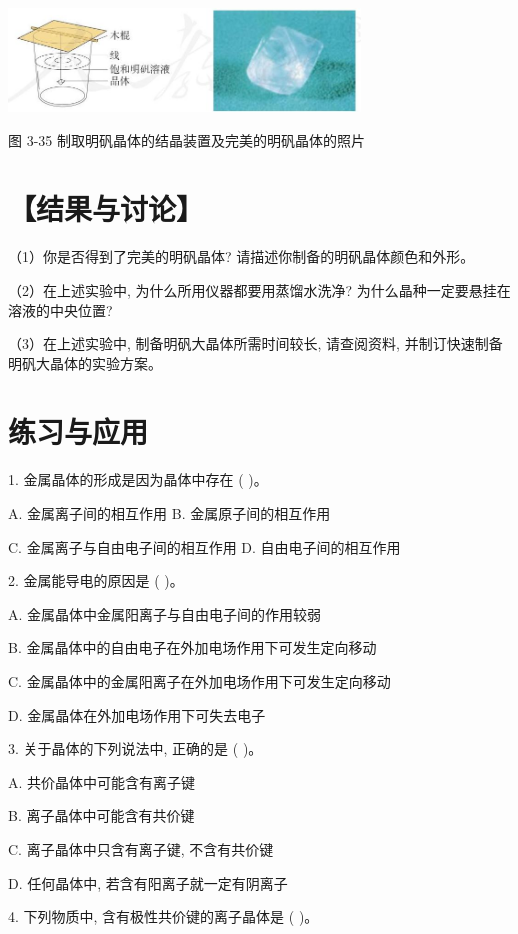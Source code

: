 \documentclass[10pt]{article}
\begin{document}
\begin{center}
\includegraphics[max width=0.7\textwidth]{images/0190e026-5a11-7df7-bd27-54d09026ba7a_96_199934.jpg}
\end{center}

图 3-35 制取明矾晶体的结晶装置及完美的明矾晶体的照片

\section*{【结果与讨论】}

（1）你是否得到了完美的明矾晶体? 请描述你制备的明矾晶体颜色和外形。

（2）在上述实验中, 为什么所用仪器都要用蒸馏水洗净? 为什么晶种一定要悬挂在溶液的中央位置?

（3）在上述实验中, 制备明矾大晶体所需时间较长, 请查阅资料, 并制订快速制备明矾大晶体的实验方案。

\section*{练习与应用}

1. 金属晶体的形成是因为晶体中存在 ( )。

A. 金属离子间的相互作用 B. 金属原子间的相互作用

C. 金属离子与自由电子间的相互作用 D. 自由电子间的相互作用

2. 金属能导电的原因是 ( )。

A. 金属晶体中金属阳离子与自由电子间的作用较弱

B. 金属晶体中的自由电子在外加电场作用下可发生定向移动

C. 金属晶体中的金属阳离子在外加电场作用下可发生定向移动

D. 金属晶体在外加电场作用下可失去电子

3. 关于晶体的下列说法中, 正确的是 ( )。

A. 共价晶体中可能含有离子键

B. 离子晶体中可能含有共价键

C. 离子晶体中只含有离子键, 不含有共价键

D. 任何晶体中, 若含有阳离子就一定有阴离子

4. 下列物质中, 含有极性共价键的离子晶体是 ( )。
\end{document}
